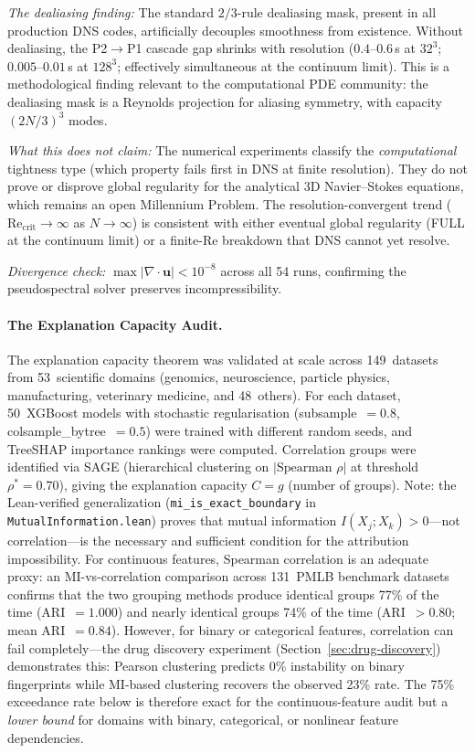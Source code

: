 \documentclass[11pt,a4paper]{article}
\begin{document}
\emph{The dealiasing finding:} The standard $2/3$-rule dealiasing mask, present in all production DNS codes, artificially decouples smoothness from existence.  Without dealiasing, the P2$\to$P1 cascade gap shrinks with resolution ($0.4$--$0.6$\,s at $32^3$; $0.005$--$0.01$\,s at $128^3$; effectively simultaneous at the continuum limit).  This is a methodological finding relevant to the computational PDE community: the dealiasing mask is a Reynolds projection for aliasing symmetry, with capacity $(2N/3)^3$ modes.

\emph{What this does not claim:} The numerical experiments classify the \emph{computational} tightness type (which property fails first in DNS at finite resolution).  They do not prove or disprove global regularity for the analytical 3D Navier--Stokes equations, which remains an open Millennium Problem.  The resolution-convergent trend ($\mathrm{Re}_{\mathrm{crit}} \to \infty$ as $N \to \infty$) is consistent with either eventual global regularity (FULL at the continuum limit) or a finite-Re breakdown that DNS cannot yet resolve.

\emph{Divergence check:} $\max|\nabla \cdot \mathbf{u}| < 10^{-8}$ across all 54 runs, confirming the pseudospectral solver preserves incompressibility.

\paragraph{The Explanation Capacity Audit.}
The explanation capacity theorem was validated at scale across 149~datasets from 53~scientific domains (genomics, neuroscience, particle physics, manufacturing, veterinary medicine, and 48~others).  For each dataset, 50~XGBoost models with stochastic regularisation (subsample~$= 0.8$, colsample\_bytree~$= 0.5$) were trained with different random seeds, and TreeSHAP importance rankings were computed.  Correlation groups were identified via SAGE (hierarchical clustering on $|\text{Spearman } \rho|$ at threshold $\rho^* = 0.70$), giving the explanation capacity $C = g$ (number of groups).  Note: the Lean-verified generalization (\texttt{mi\_is\_exact\_boundary} in \texttt{MutualInformation.lean}) proves that mutual information $I(X_j; X_k) > 0$---not correlation---is the necessary and sufficient condition for the attribution impossibility.  For continuous features, Spearman correlation is an adequate proxy: an MI-vs-correlation comparison across 131~PMLB benchmark datasets confirms that the two grouping methods produce identical groups 77\% of the time (ARI~$= 1.000$) and nearly identical groups 74\% of the time (ARI~$> 0.80$; mean ARI~$= 0.84$).  However, for binary or categorical features, correlation can fail completely---the drug discovery experiment (Section~\ref{sec:drug-discovery}) demonstrates this: Pearson clustering predicts 0\% instability on binary fingerprints while MI-based clustering recovers the observed 23\% rate.  The 75\% exceedance rate below is therefore exact for the continuous-feature audit but a \emph{lower bound} for domains with binary, categorical, or nonlinear feature dependencies.
\end{document}
